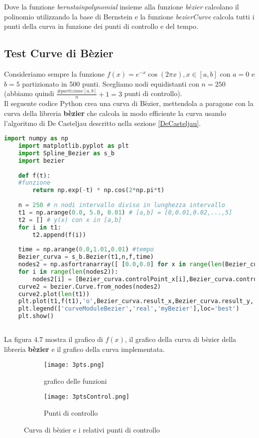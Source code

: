 \documentclass[a4paper,12pt]{report}
\theoremstyle{definition}
\begin{document}
Dove la funzione \textit{bernstainpolynomial} insieme alla funzione \textit{bèzier} calcolano il polinomio utilizzando la base di Bernstein e la funzione \textit{bezierCurve} calcola tutti i punti della curva in funzione dei punti di controllo e del tempo.\\
\subsection{Test Curve di Bèzier}
Consideriamo sempre la funzione $f(x) = e^{-x}\cos(2\pi x) , x\in[a,b]$ con $a = 0$ e $b = 5$ partizionato in 500 punti. Scegliamo nodi equidistanti con $n = 250$ (abbiamo quindi $\frac{\#partizione[a,b]}{n}+1 = 3$ punti di controllo).\\
Il seguente codice Python crea una curva di Bèzier, mettendola a paragone con la curva della libreria \textbf{bèzier} che calcola in modo efficiente la curva usando l'algoritmo di De Casteljau descritto nella sezione \ref{DeCasteljau}.
\begin{lstlisting}[language=Python]
	import numpy as np
	import matplotlib.pyplot as plt
	import Spline_Bezier as s_b
	import bezier
	
	def f(t):
	#funzione
		return np.exp(-t) * np.cos(2*np.pi*t)
	
	n = 250 # n nodi intervallo diviso in lunghezza intervallo 
	t1 = np.arange(0.0, 5.0, 0.01) # [a,b] = [0,0.01,0.02,...,5] 
	t2 = [] # y(x) con x in [a,b]
	for i in t1:
		t2.append(f(i))
	
	time = np.arange(0.0,1.01,0.01) #tempo
	Bezier_curva = s_b.Bezier(t1,n,f,time)
	nodes2 = np.asfortranarray([ [0.0,0.0] for x in range(len(Bezier_curva.controlPoint_x))])
	for i in range(len(nodes2)):
		nodes2[i] = [Bezier_curva.controlPoint_x[i],Bezier_curva.controlPoint_y[i]]
	curve2 = bezier.Curve.from_nodes(nodes2)
	curve2.plot(len(t1))
	plt.plot(t1,f(t1),'o',Bezier_curva.result_x,Bezier_curva.result_y,'k')
	plt.legend(['curveModuleBezier','real','myBezier'],loc='best')
	plt.show()
	
\end{lstlisting}
La figura $4.7$ mostra il grafico di $f(x)$, il grafico della curva di bèzier della libreria \textbf{bèzier} e il grafico della curva implementata.
\newpage
\begin{figure}[h!t]
	\centering
	\begin{subfigure}{0.6\linewidth}
		\texttt{[image: 3pts.png]}
		\caption{grafico delle funzioni}
	\end{subfigure}
	\begin{subfigure}{0.4\linewidth}
		\texttt{[image: 3ptsControl.png]}
		\caption{Punti di controllo}
	\end{subfigure}
	\caption{Curva di bèzier e i relativi punti di controllo}
	\label{fig:5pts}
\end{figure}
\end{document}
